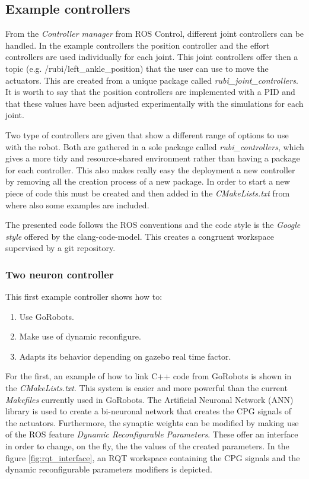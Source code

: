 
\subsection{Example controllers} %
\label{sub:example_controllers}
From the \textit{Controller manager} from ROS Control, different joint controllers can be handled.
In the example controllers the position controller and the effort controllers are used individually for each joint.
This joint controllers offer then a topic (e.g. /rubi/left\_ankle\_position) that the user can use to move the actuators.
This are created from a unique package called \textit{rubi\_joint\_controllers}.
It is worth to say that the position controllers are implemented with a PID and that these values have been adjusted experimentally with the simulations for each joint.

Two type of controllers are given that show a different range of options to use with the robot.
Both are gathered in a sole package called \textit{rubi\_controllers}, which gives a more tidy and resource-shared environment rather than having a package for each controller.
This also makes really easy the deployment a new controller by removing all the creation process of a new package.
In order to start a new piece of code this must be created and then added in the \textit{CMakeLists.txt} from where also some examples are included.

The presented code follows the ROS conventions and the code style is the \textit{Google style} offered by the clang-code-model.
This creates a congruent workspace supervised by a git repository.

\subsubsection{Two neuron controller} %
\label{ssub:two_neuron_controller}
This first example controller shows how to:
\begin{enumerate}
    \item Use GoRobots.
    \item Make use of dynamic reconfigure.
    \item Adapts its behavior depending on gazebo real time factor.
\end{enumerate}
For the first, an example of how to link C++ code from GoRobots is shown in the \textit{CMakeLists.txt}.
This system is easier and more powerful than the current \textit{Makefiles} currently used in GoRobots.
The Artificial Neuronal Network (ANN) library is used to create a bi-neuronal network that creates the CPG signals of the actuators.
Furthermore, the synaptic weights can be modified by making use of the ROS feature \textit{Dynamic Reconfigurable Parameters}.
These offer an interface in order to change, on the fly, the the values of the created parameters.
In the figure \ref{fig:rqt_interface}, an RQT workspace containing the CPG signals and the dynamic reconfigurable parameters modifiers is depicted.

